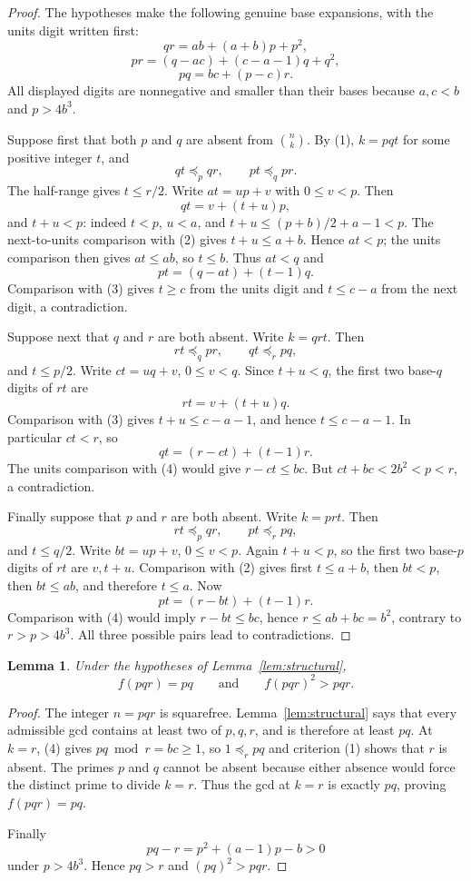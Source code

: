 \documentclass[11pt]{article}
\newtheorem{lemma}[theorem]{Lemma}
\newcommand{\choosef}[2]{\binom{#1}{#2}}
\begin{document}
\begin{proof}
The hypotheses make the following genuine base expansions, with the units
digit written first:
\[
 qr=ab+(a+b)p+p^2,                                         \tag{2}
\]
\[
 pr=(q-ac)+(c-a-1)q+q^2,                                  \tag{3}
\]
\[
 pq=bc+(p-c)r.                                             \tag{4}
\]
All displayed digits are nonnegative and smaller than their bases because
$a,c<b$ and $p>4b^3$.

Suppose first that both $p$ and $q$ are absent from $\choosef nk$.  By (1),
$k=pqt$ for some positive integer $t$, and
\[
 qt\preceq_p qr,\qquad pt\preceq_q pr.                    \tag{5}
\]
The half-range gives $t\leq r/2$.  Write $at=up+v$ with $0\leq v<p$.
Then
\[
 qt=v+(t+u)p,
\]
and $t+u<p$: indeed $t<p$, $u<a$, and
$t+u\leq(p+b)/2+a-1<p$.  The next-to-units comparison with (2) gives
$t+u\leq a+b$.  Hence $at<p$; the units comparison then gives
$at\leq ab$, so $t\leq b$.  Thus $at<q$ and
\[
 pt=(q-at)+(t-1)q.
\]
Comparison with (3) gives $t\geq c$ from the units digit and
$t\leq c-a$ from the next digit, a contradiction.

Suppose next that $q$ and $r$ are both absent.  Write $k=qrt$.  Then
\[
 rt\preceq_q pr,\qquad qt\preceq_r pq,
\]
and $t\leq p/2$.  Write $ct=uq+v$, $0\leq v<q$.  Since $t+u<q$, the first
two base-$q$ digits of $rt$ are
\[
 rt=v+(t+u)q.
\]
Comparison with (3) gives $t+u\leq c-a-1$, and hence
$t\leq c-a-1$.  In particular $ct<r$, so
\[
 qt=(r-ct)+(t-1)r.
\]
The units comparison with (4) would give $r-ct\leq bc$.  But
$ct+bc<2b^2<p<r$, a contradiction.

Finally suppose that $p$ and $r$ are both absent.  Write $k=prt$.  Then
\[
 rt\preceq_p qr,\qquad pt\preceq_r pq,
\]
and $t\leq q/2$.  Write $bt=up+v$, $0\leq v<p$.  Again $t+u<p$, so the
first two base-$p$ digits of $rt$ are $v,t+u$.  Comparison with (2) gives
first $t\leq a+b$, then $bt<p$, then $bt\leq ab$, and therefore $t\leq a$.
Now
\[
 pt=(r-bt)+(t-1)r.
\]
Comparison with (4) would imply $r-bt\leq bc$, hence
$r\leq ab+bc=b^2$, contrary to $r>p>4b^3$.  All three possible pairs lead
to contradictions.
\end{proof}

\begin{lemma}\label{lem:value}
Under the hypotheses of Lemma~\ref{lem:structural},
\[
 f(pqr)=pq\qquad\text{and}\qquad f(pqr)^2>pqr.
\]
\end{lemma}

\begin{proof}
The integer $n=pqr$ is squarefree.  Lemma~\ref{lem:structural} says that
every admissible gcd contains at least two of $p,q,r$, and is therefore at
least $pq$.  At $k=r$, (4) gives $pq\bmod r=bc\geq1$, so
$1\preceq_r pq$ and criterion (1) shows that $r$ is absent.  The primes
$p$ and $q$ cannot be absent because either absence would force the distinct
prime to divide $k=r$.  Thus the gcd at $k=r$ is exactly $pq$, proving
$f(pqr)=pq$.

Finally
\[
 pq-r=p^2+(a-1)p-b>0
\]
under $p>4b^3$.  Hence $pq>r$ and
$(pq)^2>pqr$.
\end{proof}
\end{document}
